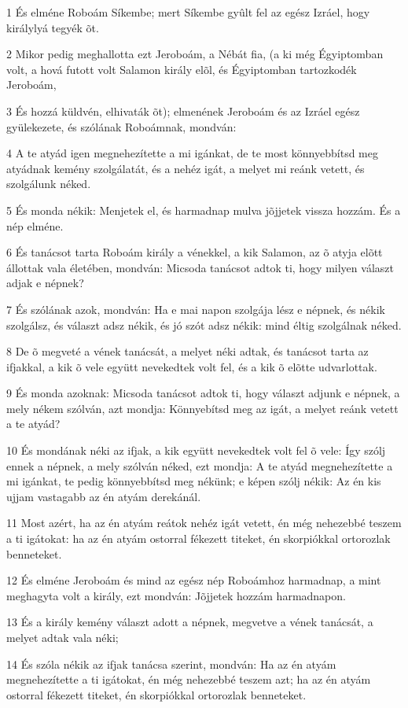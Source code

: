 \par 1 És elméne Roboám Síkembe; mert Síkembe gyûlt fel az egész Izráel, hogy királylyá tegyék õt.
\par 2 Mikor pedig meghallotta ezt Jeroboám, a Nébát fia, (a ki még Égyiptomban volt, a hová futott volt Salamon király elõl, és Égyiptomban tartozkodék Jeroboám,
\par 3 És hozzá küldvén, elhivaták õt); elmenének Jeroboám és az Izráel egész gyülekezete, és szólának Roboámnak, mondván:
\par 4 A te atyád igen megnehezítette a mi igánkat, de te most könnyebbítsd meg atyádnak kemény szolgálatát, és a nehéz igát, a melyet mi reánk vetett, és szolgálunk néked.
\par 5 És monda nékik: Menjetek el, és harmadnap mulva jõjjetek vissza hozzám. És a nép elméne.
\par 6 És tanácsot tarta Roboám király a vénekkel, a kik Salamon, az õ atyja elõtt állottak vala életében, mondván: Micsoda tanácsot adtok ti, hogy milyen választ adjak e népnek?
\par 7 És szólának azok, mondván: Ha e mai napon szolgája lész e népnek, és nékik szolgálsz, és választ adsz nékik, és jó szót adsz nékik: mind éltig szolgálnak néked.
\par 8 De õ megveté a vének tanácsát, a melyet néki adtak, és tanácsot tarta az ifjakkal, a kik õ vele együtt nevekedtek volt fel, és a kik õ elõtte udvarlottak.
\par 9 És monda azoknak: Micsoda tanácsot adtok ti, hogy választ adjunk e népnek, a mely nékem szólván, azt mondja: Könnyebítsd meg az igát, a melyet reánk vetett a te atyád?
\par 10 És mondának néki az ifjak, a kik együtt nevekedtek volt fel õ vele: Így szólj ennek a népnek, a mely szólván néked, ezt mondja: A te atyád megnehezítette a mi igánkat, te pedig könnyebbítsd meg nékünk; e képen szólj nékik: Az én kis ujjam vastagabb az én atyám derekánál.
\par 11 Most azért, ha az én atyám reátok nehéz igát vetett, én még nehezebbé teszem a ti igátokat: ha az én atyám ostorral fékezett titeket, én skorpiókkal ortorozlak benneteket.
\par 12 És elméne Jeroboám és mind az egész nép Roboámhoz harmadnap, a mint meghagyta volt a király, ezt mondván: Jõjjetek hozzám harmadnapon.
\par 13 És a király kemény választ adott a népnek, megvetve a vének tanácsát, a melyet adtak vala néki;
\par 14 És szóla nékik az ifjak tanácsa szerint, mondván: Ha az én atyám megnehezítette a ti igátokat, én még nehezebbé teszem azt; ha az én atyám ostorral fékezett titeket, én skorpiókkal ortorozlak benneteket.

